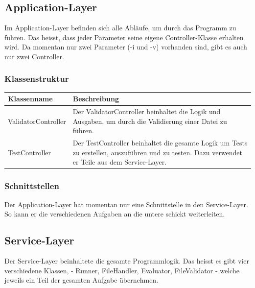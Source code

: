 \documentclass[a4,12pt]{scrartcl}
\begin{document}
\subsection{Application-Layer}
Im Application-Layer befinden sich alle Abläufe, um durch das Programm zu führen. Das heisst, dass jeder Parameter seine eigene Controller-Klasse erhalten wird. Da momentan nur zwei Parameter (-i und -v) vorhanden sind, gibt es auch nur zwei Controller.
\subsubsection{Klassenstruktur}
\begin{table}[H]
\centering
    \begin{tabular}{@{}l p{11cm} @{}}\toprule    
    {Klassenname} & {Beschreibung}\\ \midrule
    ValidatorController & Der ValidatorController beinhaltet die Logik und Ausgaben, um durch die Validierung einer Datei zu führen.\\       
    TestController & Der TestController beinhaltet die gesamte Logik um Tests zu erstellen, auszuführen und zu testen. Dazu verwendet er Teile aus dem Service-Layer. \\
    \bottomrule
    \end{tabular}
\end{table}
\subsubsection{Schnittstellen}
Der Application-Layer hat momentan nur eine Schnittstelle in den Service-Layer. So kann er die verschiedenen Aufgaben an die untere schickt weiterleiten.



\subsection{Service-Layer}
Der Service-Layer beinhaltete die gesamte Programmlogik. Das heisst es gibt vier verschiedene Klassen, - Runner, FileHandler, Evaluator, FileValidator - welche jeweils ein Teil der gesamten Aufgabe übernehmen.
\end{document}
